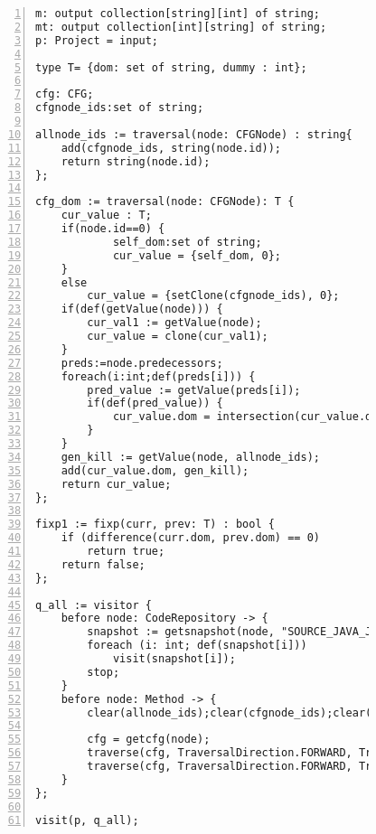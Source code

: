 \begin{figure}[ht!]
\begin{lstlisting}[numbers=left, tabsize=4, escapechar=@, caption={Dominator analysis},label={lst:dominator-code}] 
m: output collection[string][int] of string;
mt: output collection[int][string] of string;
p: Project = input;

type T= {dom: set of string, dummy : int};

cfg: CFG;
cfgnode_ids:set of string;

allnode_ids := traversal(node: CFGNode) : string{
	add(cfgnode_ids, string(node.id));
	return string(node.id);
};

cfg_dom := traversal(node: CFGNode): T {
	cur_value : T;
	if(node.id==0) {
			self_dom:set of string;
			cur_value = {self_dom, 0};
	}
	else
		cur_value = {setClone(cfgnode_ids), 0};
	if(def(getValue(node))) {
		cur_val1 := getValue(node);
		cur_value = clone(cur_val1);
	}
	preds:=node.predecessors;
	foreach(i:int;def(preds[i])) {
		pred_value := getValue(preds[i]);
		if(def(pred_value)) {
			cur_value.dom = intersection(cur_value.dom,pred_value.dom);
		}
	}	
	gen_kill := getValue(node, allnode_ids);
	add(cur_value.dom, gen_kill);
	return cur_value;
};

fixp1 := fixp(curr, prev: T) : bool {
 	if (difference(curr.dom, prev.dom) == 0)
 		return true;	
 	return false;
};

q_all := visitor {
	before node: CodeRepository -> {
		snapshot := getsnapshot(node, "SOURCE_JAVA_JLS");
		foreach (i: int; def(snapshot[i]))
			visit(snapshot[i]);
		stop;
	}
	before node: Method -> {
		clear(allnode_ids);clear(cfgnode_ids);clear(cfg_dom);

		cfg = getcfg(node);
		traverse(cfg, TraversalDirection.FORWARD, TraversalKind.HYBRID, allnode_ids);
		traverse(cfg, TraversalDirection.FORWARD, TraversalKind.HYBRID, cfg_dom, fixp1);
	}
};

visit(p, q_all);

\end{lstlisting}
\end{figure}


